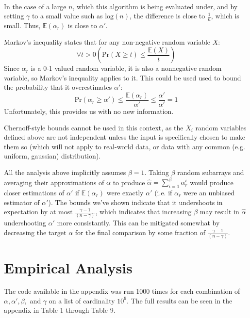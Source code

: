 \documentclass{article}
\begin{document}
\paragraph{}In the case of a large $n$, which this algorithm is being evaluated under, and by setting $\gamma$ to a small value such as $\text{log}(n)$, the difference is close to $\frac{1}{n}$, which is small.
 Thus, $\mathbb E(\alpha_{r})$ is close to $\alpha'$.

Markov's inequality states that for any non-negative random variable $X$:
\begin{equation*}
\forall t>0(\text{Pr}(X \ge t) \le \frac{\mathbb E(X)}{t})
\end{equation*}
Since $\alpha_r$ is a 0-1 valued random variable, it is also a nonnegative random variable, so Markov's inequality applies to it.
This could be used used to bound the probability that it overestimates $\alpha'$:
\begin{equation*}
\text{Pr}(\alpha_r \ge \alpha')
\le \frac{\mathbb E(\alpha_r)}{\alpha'}
\le \frac{\alpha'}{\alpha'} = 1
\end{equation*}
Unfortunately, this provides us with no new information.

Chernoff-style bounds cannot be used in this context, as the $X_i$ random variables defined above are not independent unless the input is specifically chosen to make them so (which will not apply to real-world data, or data with any common (e.g. uniform, gaussian) distribution).

All the analysis above implicitly assumes $\beta=1$.
Taking $\beta$ random subarrays and averaging their approximations of $\alpha$ to produce $\hat{\alpha} = \sum_{i=1}^\beta\alpha_r^i$ would produce closer estimations of $\alpha'$ if $\mathbb E(\alpha_r)$ were exactly $\alpha'$ (i.e. if $\alpha_r$ were an unbiased estimator of $\alpha'$).
The bounds we've shown indicate that it undershoots in expectation by at most $\frac{\gamma - 1}{(n - \gamma)}$, which indicates that increasing $\beta$ may result in $\hat{\alpha}$ undershooting $\alpha'$ more consistantly.
This can be mitigated somewhat by decreasing the target $\alpha$ for the final comparison by some fraction of $\frac{\gamma - 1}{(n - \gamma)}$.
\section{Empirical Analysis}
\paragraph{}The code available in the appendix was run 1000 times for each combination of $\alpha, \alpha', \beta,$ and $\gamma$ on a list of cardinality $10^9$.
 The full results can be seen in the appendix in Table 1 through Table 9.
\end{document}
